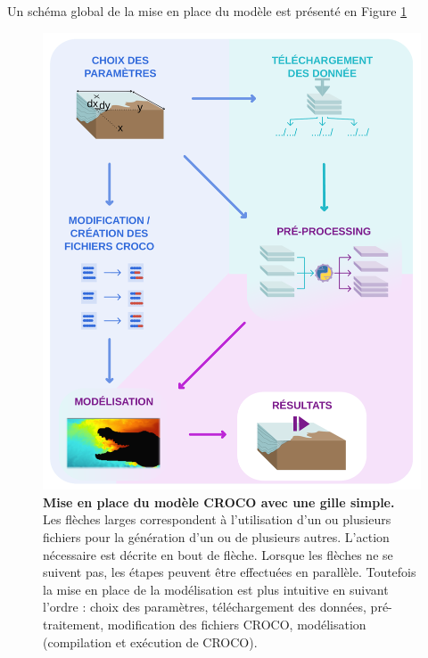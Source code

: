 \documentclass[10pt,a4paper,titlepage]{article}
\begin{document}
Un schéma global de la mise en place du modèle est présenté en Figure \ref{fig:workflow_simple}
\begin{figure}[h!]
    \centering
    \includegraphics[scale=0.35]{../images/workflow/mise_en_place_generale_croco.pdf}
    \caption{
        \textbf{Mise en place du modèle CROCO avec une gille simple.}
        \\Les flèches larges correspondent à l'utilisation d'un ou plusieurs fichiers pour la génération d'un ou de plusieurs autres.
        L'action nécessaire est décrite en bout de flèche.
        Lorsque les flèches ne se suivent pas, les étapes peuvent être effectuées en parallèle.
        Toutefois la mise en place de la modélisation est plus intuitive en suivant l'ordre : {\color{paramColor}choix des paramètres}, {\color{dataColor} téléchargement des données}, {\color{workColor} pré-traitement}, {\color{paramColor} modification des fichiers CROCO}, {\color{workColor} modélisation (compilation et exécution de CROCO)}.
    }
    \label{fig:workflow_simple}
\end{figure}


\end{document}
